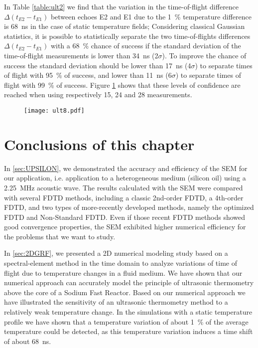 In Table \ref{table:ult2} we find that the variation in the time-of-flight difference $\Delta(t_{E2}-t_{E1})$
between echoes E2 and E1 due to the \SI{1}{\percent} temperature difference is \SI{68}{\nano\second} in the case of static temperature fields; Considering
classical Gaussian statistics, it is possible to statistically separate the two time-of-flights differences $\Delta(t_{E2}-t_{E1})$ with a
\SI{68}{\percent} chance of success if the standard deviation of the time-of-flight measurements is lower than \SI{34}{\nano\second} (\num{2}$\sigma$).
To improve the chance of success the standard deviation should be lower than \SI{17}{\nano\second} (\num{4}$\sigma$) to separate times of flight with
\SI{95}{\percent} of success, and lower than \SI{11}{\nano\second} (\num{6}$\sigma$) to separate times of flight with \SIlist{99}{\percent} of
success. Figure \ref{fig:ult8} shows that these levels of confidence are reached when using respectively \num{15}, \num{24} and \num{28} measurements.

                \begin{figure}[htbp]
                        \centerline{\texttt{[image: ult8.pdf]}}
                    \label{fig:ult8}
                \end{figure}

\vspace*{-0.8truecm}
\section{Conclusions of this chapter}

In \autoref{sec:UPSILON}, we demonstrated the accuracy and efficiency of the SEM for our application, i.e. application to a heterogeneous medium (silicon oil)
using a \SI{2.25}{\mega\hertz} acoustic wave.
The results calculated with the SEM were compared with several FDTD methods, including a classic 2nd-order FDTD, a 4th-order FDTD,
and two types of more-recently developed methods, namely the optimized FDTD and Non-Standard FDTD.
Even if those recent FDTD methods showed good convergence properties, the SEM exhibited higher numerical efficiency for the problems that we want to study.

In \autoref{sec:2DGRF}, we presented a 2D numerical modeling study based on a spectral-element method in the time domain to analyze variations of time of flight due to
temperature changes in a fluid medium. We have shown that our numerical approach can accurately model the principle of ultrasonic thermometry above the core of
a Sodium Fast Reactor. Based on our numerical approach we have illustrated the sensitivity of an ultrasonic thermometry method to a relatively weak temperature
change. In the simulations with a static temperature profile we have shown that a temperature variation of about \SI{1}{\percent} of the average temperature
could be detected, as this temperature variation induces a time shift of about \SI{68}{\nano\second}.

